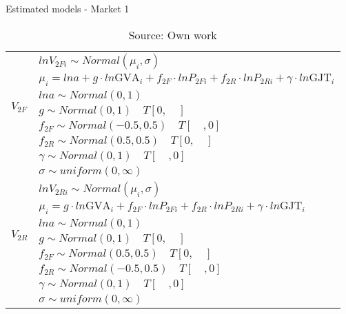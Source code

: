 
\begin{table}[!ht] \centering 
  \caption{Estimated models - Market 1} 
  \label{tbl:models_statement_mkt1} 
{\renewcommand\arraystretch{1.25}}
\begin{tabular} {ll}
\toprule
\multirow{7}{*}{$V_{2F}$} &$lnV_{2Fi} \sim Normal(\mu_i, \sigma) $ \\
                          &$\mu_i = ln a + g \cdot ln \text{GVA}_i + f_{2F} \cdot lnP_{2Fi} + f_{2R} \cdot lnP_{2Ri} + \gamma \cdot ln\text{GJT}_i$ \\
                          &$ln a \sim Normal (0,1) $\\
                          &$g \sim Normal (0,1) \quad T[0,\quad]$\\
                          &$f_{2F} \sim Normal (-0.5,0.5) \quad T[\quad,0] $\\
                          &$f_{2R} \sim Normal (0.5,0.5) \quad T[0,\quad] $\\
                          &$\gamma \sim Normal (0,1) \quad T[\quad,0] $\\
                          &$\sigma \sim uniform(0,\infty) $\\ 
\hline
\multirow{7}{*}{$V_{2R}$} &$lnV_{2Ri} \sim Normal(\mu_i, \sigma) $ \\
                          &$\mu_i = g \cdot ln \text{GVA}_i + f_{2F} \cdot lnP_{2Fi} + f_{2R} \cdot lnP_{2Ri} + \gamma \cdot ln\text{GJT}_i$ \\
                          &$ln a \sim Normal (0,1) $\\
                          &$g \sim Normal (0,1) \quad T[0,\quad]$\\
                          &$f_{2F} \sim Normal (0.5,0.5) \quad T[0,\quad] $\\
                          &$f_{2R} \sim Normal (-0.5,0.5) \quad T[\quad,0] $\\
                          &$\gamma \sim Normal (0,1) \quad T[\quad,0] $\\
                          &$\sigma \sim uniform(0,\infty) $\\ 
\bottomrule
\end{tabular}%
\caption*{Source: Own work}
\end{table} 

